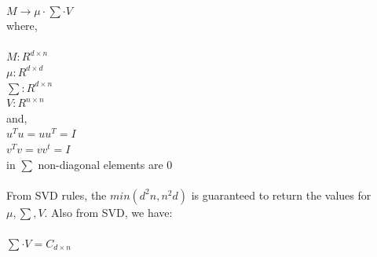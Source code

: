 \documentclass[12pt]{article}
\begin{document}
\\$M \rightarrow \mu \cdot \sum \cdot V$
\\where,\\
\\$M: R^{d \times n}$
\\$\mu: R^{d \times d}$
\\$\sum: R^{d \times n}$
\\$V: R^{n \times n}$
\\and,
\\$u^Tu=uu^T=I$
\\$v^Tv=vv^t=I$
\\in $\sum$ non-diagonal elements are 0
\\
\\From SVD rules, the $min(d^2n,n^2d)$ is guaranteed to return the values for $\mu,\sum,V$. Also from SVD, we have:\\

\\$\sum \cdot V = C_{d\times n}$
\end{document}
